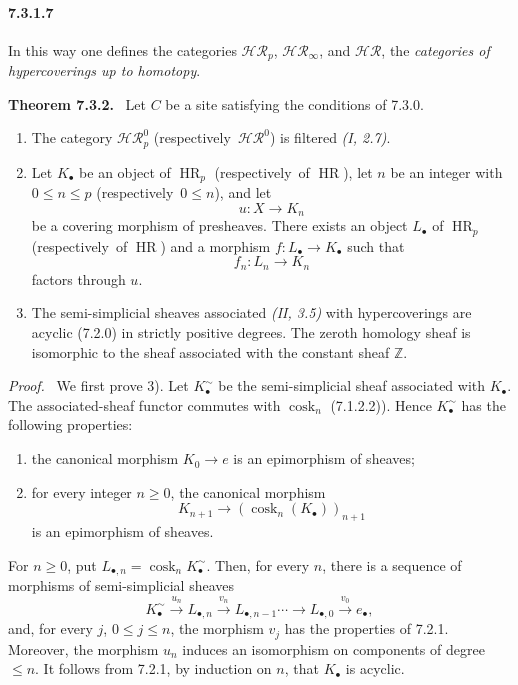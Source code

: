 \documentclass[11pt]{article}
\newcommand{\ZZ}{\mathbb Z}
\newcommand{\cosk}{\operatorname{cosk}}
\newcommand{\HR}{\operatorname{HR}}
\newcommand{\resp}{respectively}
\newcommand{\sheaf}[1]{\mathcal{#1}}
\newenvironment{statement}[1]{\par\medskip\noindent\textbf{#1.}\ }{\par\medskip}
\newenvironment{prooftext}{\par\noindent\emph{Proof.}\ }{\par\medskip}
\begin{document}
\paragraph*{7.3.1.7}
In this way one defines the categories $\sheaf{HR}_p$, $\sheaf{HR}_\infty$, and $\sheaf{HR}$, the \emph{categories of hypercoverings up to homotopy}.

\begin{statement}{Theorem 7.3.2}
Let $C$ be a site satisfying the conditions of 7.3.0.
\begin{enumerate}[label=\arabic*)]
\item The category $\sheaf{HR}_p^0$ (\resp\ $\sheaf{HR}^0$) is filtered \emph{(I, 2.7)}.
\item Let $K_\bullet$ be an object of $\HR_p$ (\resp\ of $\HR$), let $n$ be an integer with $0\leq n\leq p$ (\resp\ $0\leq n$), and let
\[
        u:X\to K_n
\]
be a covering morphism of presheaves. There exists an object $L_\bullet$ of $\HR_p$ (\resp\ of $\HR$) and a morphism $f:L_\bullet\to K_\bullet$ such that
\[
        f_n:L_n\to K_n
\]
factors through $u$.
\item The semi-simplicial sheaves associated \emph{(II, 3.5)} with hypercoverings are acyclic (7.2.0) in strictly positive degrees. The zeroth homology sheaf is isomorphic to the sheaf associated with the constant sheaf $\ZZ$.
\end{enumerate}
\end{statement}

\begin{prooftext}
We first prove 3). Let $K_\bullet^{\sim}$ be the semi-simplicial sheaf associated with $K_\bullet$. The associated-sheaf functor commutes with $\cosk_n$ (7.1.2.2)). Hence $K_\bullet^{\sim}$ has the following properties:
\begin{enumerate}[label=\alph*)]
\item the canonical morphism $K_0\to e$ is an epimorphism of sheaves;
\item for every integer $n\geq 0$, the canonical morphism
\[
        K_{n+1}\to (\cosk_n(K_\bullet))_{n+1}
\]
is an epimorphism of sheaves.
\end{enumerate}
\end{prooftext}

For $n\geq 0$, put $L_{\bullet,n}=\cosk_nK_\bullet^{\sim}$. Then, for every $n$, there is a sequence of morphisms of semi-simplicial sheaves
\[
        K_\bullet^{\sim}\xrightarrow{u_n}L_{\bullet,n}\xrightarrow{v_n}L_{\bullet,n-1}\cdots\to L_{\bullet,0}\xrightarrow{v_0}e_\bullet,
\]
and, for every $j$, $0\leq j\leq n$, the morphism $v_j$ has the properties of 7.2.1. Moreover, the morphism $u_n$ induces an isomorphism on components of degree $\leq n$. It follows from 7.2.1, by induction on $n$, that $K_\bullet$ is acyclic.
\end{document}
